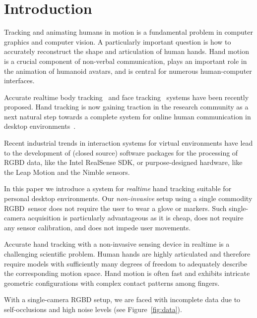 

\section{Introduction} \label{sec:htrack-intro}

Tracking and animating humans in motion is a fundamental problem in computer graphics and computer vision. A particularly important question is how to accurately reconstruct the shape and articulation of human hands. Hand motion is a crucial component of non-verbal communication, plays an important role in the animation of humanoid avatars, and is central for numerous human-computer interfaces. 

Accurate realtime body tracking~\cite{shotton_cvpr11,wei_siga12} and face tracking~\cite{cao_sig14} systems have been recently proposed. Hand tracking is now gaining traction in the research community as a next natural step towards a complete system for online human communication in desktop environments~\cite{oiko2011hand,melax2013dynamics,sridhar2014anisotropic,schroder2014real,tompson2014real}.

Recent industrial trends in interaction systems for virtual environments have lead to the development of (closed source) software packages for the processing of RGBD data, like the Intel RealSense SDK, or purpose-designed hardware, like the Leap Motion and the Nimble sensors. 


In this paper we introduce a system for \emph{realtime} hand tracking suitable for personal desktop environments. Our \emph{non-invasive} setup using a single commodity RGBD~sensor does not require the user to wear a glove or markers. 
Such single-camera acquisition is particularly advantageous as it is cheap, does not require any sensor calibration, and does not impede user movements. 

Accurate hand tracking with a non-invasive sensing device in realtime is a challenging scientific problem. Human hands are highly articulated and therefore require models with sufficiently many degrees of freedom to adequately describe the corresponding motion space. Hand motion is often fast and exhibits intricate geometric configurations with complex contact patterns among fingers. 

With a single-camera RGBD setup, we are faced with incomplete data due to self-occlusions and high noise levels (see Figure~\ref{fig:data}).

